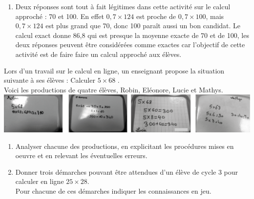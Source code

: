 \begin{corrige}
\begin{enumerate}
\begin{itemize}
   \end{itemize}
   \item Deux réponses sont tout à fait légitimes dans cette activité sur le calcul approché : 70 et 100. En effet $0,7 \times 124$ est proche de $0,7 \times 100$, mais $0,7 \times 124$ est plus grand que 70, donc 100 paraît aussi un bon candidat. Le calcul exact donne 86,8 qui est presque la moyenne exacte de 70 et de 100,  les deux réponses peuvent être considérées comme exactes car l'objectif de cette activité est de faire faire un calcul approché aux élèves.
   \end{enumerate}
\end{corrige}

\clearpage


\begin{exercice}[CRPE 2018 G2]
Lors d’un travail sur le calcul en ligne, un enseignant propose la situation suivante à ses élèves : \og Calculer $5\times68$ \fg. \\
Voici les productions de quatre élèves, Robin, Eléonore, Lucie et Mathys. \\ [2mm]
   \includegraphics[width=17cm]{Nombres_et_calculs_did/Images/Num2_analyse_5x8}
\begin{enumerate}
   \item Analyser chacune des productions, en explicitant les procédures mises en oeuvre et en relevant les éventuelles erreurs.
   \item Donner trois démarches pouvant être attendues d’un élève de cycle 3 pour calculer en ligne $25\times28$. \\
   Pour chacune de ces démarches indiquer les connaissances en jeu.
\end{enumerate}
\end{exercice}

